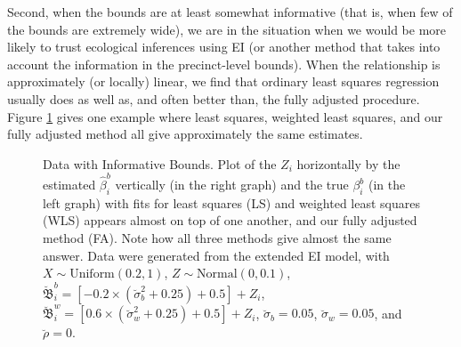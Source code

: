 \documentclass[11pt,titlepage]{article}
\newcommand{\bbeta}{{\mathfrak B}}
\newcommand{\sigmau}{\breve{\sigma}}
\newcommand{\rhou}{\breve{\rho}}
\begin{document}
Second, when the bounds are at least somewhat informative (that is,
when few of the bounds are extremely wide), we are in the situation
when we would be more likely to trust ecological inferences using EI
(or another method that takes into account the information in the
precinct-level bounds).  When the relationship is approximately (or
locally) linear, we find that ordinary least squares regression
usually does as well as, and often better than, the fully adjusted
procedure.  Figure \ref{f:narrow} gives one example where least
squares, weighted least squares, and our fully adjusted method all
give approximately the same estimates.
\begin{figure}[t]
  \begin{center}
    \caption{Data with Informative Bounds. Plot of the $Z_i$ horizontally by
      the estimated $\hat\beta_i^b$ vertically (in the right graph)
      and the true $\beta_i^b$ (in the left graph) with fits for least
      squares (LS) and weighted least squares (WLS) appears almost on
      top of one another, and our fully adjusted method (FA).  Note
      how all three methods give almost the same answer. Data were
      generated from the extended EI model, with $X \sim
      \textrm{Uniform}(0.2,1)$, $Z \sim \textrm{Normal}(0,0.1)$,
      $\breve\bbeta_i^b = [-0.2 \times (\sigmau_b^2 + 0.25) + 0.5] +
      Z_i$, $\breve\bbeta_i^w = [0.6 \times (\sigmau_w^2 + 0.25) +
      0.5] + Z_i$, $\sigmau_b = 0.05$, $\sigmau_w = 0.05$, and
      $\rhou = 0$.}
    \label{f:narrow}
  \end{center}
\end{figure}
\end{document}
